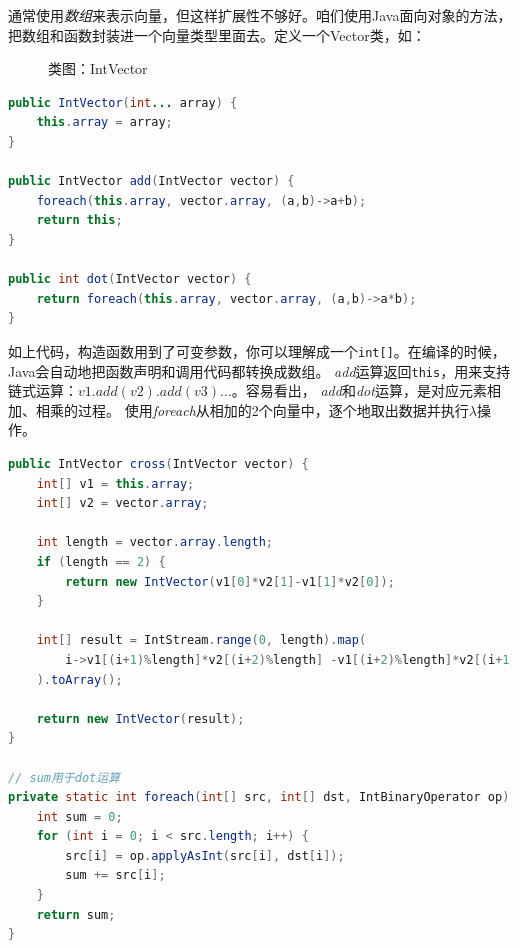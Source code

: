 \noindent
通常使用\emph{数组}来表示向量，但这样扩展性不够好。咱们使用Java面向对象的方法，把数组和函数封装进一个向量类型里面去。定义一个Vector类，如：

\begin{figure}[!htb]
\begin{center}\end{center}
\caption{类图：IntVector}
\end{figure}

\begin{lstlisting}[language=Java]
public IntVector(int... array) {
    this.array = array;
}

public IntVector add(IntVector vector) {
    foreach(this.array, vector.array, (a,b)->a+b);
    return this;
}

public int dot(IntVector vector) {
    return foreach(this.array, vector.array, (a,b)->a*b);
}
\end{lstlisting}

\noindent
如上代码，构造函数用到了可变参数，你可以理解成一个\lstinline{int[]}。在编译的时候，Java会自动地把函数声明和调用代码都转换成数组。
\emph{add}运算返回\lstinline{this}，用来支持链式运算：$v1.add(v2).add(v3)\dots$。容易看出，
\emph{add}和\emph{dot}运算，是对应元素相加、相乘的过程。
使用\emph{foreach}从相加的2个向量中，逐个地取出数据并执行$\lambda$操作。\\

\begin{lstlisting}[language=Java,caption=叉乘运算]
public IntVector cross(IntVector vector) {
    int[] v1 = this.array;
    int[] v2 = vector.array;

    int length = vector.array.length;
    if (length == 2) {
        return new IntVector(v1[0]*v2[1]-v1[1]*v2[0]);
    }

    int[] result = IntStream.range(0, length).map(
        i->v1[(i+1)%length]*v2[(i+2)%length] -v1[(i+2)%length]*v2[(i+1)%length]
    ).toArray();

    return new IntVector(result);
}

// sum用于dot运算
private static int foreach(int[] src, int[] dst, IntBinaryOperator op) {
    int sum = 0;
    for (int i = 0; i < src.length; i++) {
        src[i] = op.applyAsInt(src[i], dst[i]);
        sum += src[i];
    }
    return sum;
}
\end{lstlisting}

